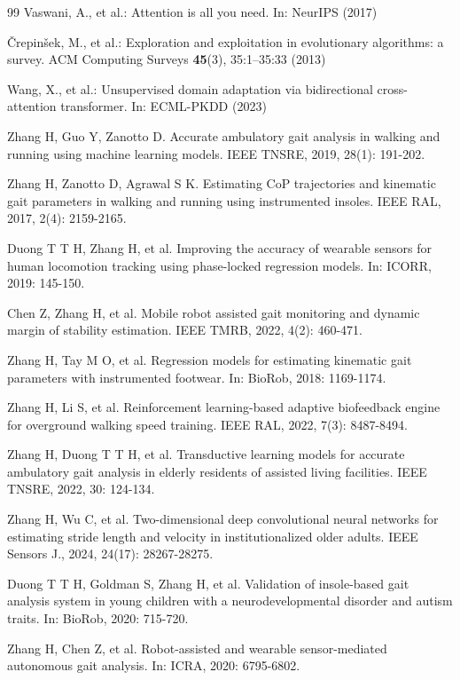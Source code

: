 \documentclass[conference]{IEEEtran}
\begin{document}
\begin{thebibliography}{99}
Vaswani, A., et al.: Attention is all you need. In: NeurIPS (2017)

Črepinšek, M., et al.: Exploration and exploitation in evolutionary algorithms: a survey. ACM Computing Surveys \textbf{45}(3), 35:1--35:33 (2013)

Wang, X., et al.: Unsupervised domain adaptation via bidirectional cross-attention transformer. In: ECML-PKDD (2023)

Zhang H, Guo Y, Zanotto D. Accurate ambulatory gait analysis in walking and running using machine learning models. IEEE TNSRE, 2019, 28(1): 191-202.

Zhang H, Zanotto D, Agrawal S K. Estimating CoP trajectories and kinematic gait parameters in walking and running using instrumented insoles. IEEE RAL, 2017, 2(4): 2159-2165.

Duong T T H, Zhang H, et al. Improving the accuracy of wearable sensors for human locomotion tracking using phase-locked regression models. In: ICORR, 2019: 145-150.

Chen Z, Zhang H, et al. Mobile robot assisted gait monitoring and dynamic margin of stability estimation. IEEE TMRB, 2022, 4(2): 460-471.

Zhang H, Tay M O, et al. Regression models for estimating kinematic gait parameters with instrumented footwear. In: BioRob, 2018: 1169-1174.

Zhang H, Li S, et al. Reinforcement learning-based adaptive biofeedback engine for overground walking speed training. IEEE RAL, 2022, 7(3): 8487-8494.

Zhang H, Duong T T H, et al. Transductive learning models for accurate ambulatory gait analysis in elderly residents of assisted living facilities. IEEE TNSRE, 2022, 30: 124-134.

Zhang H, Wu C, et al. Two-dimensional deep convolutional neural networks for estimating stride length and velocity in institutionalized older adults. IEEE Sensors J., 2024, 24(17): 28267-28275.

Duong T T H, Goldman S, Zhang H, et al. Validation of insole-based gait analysis system in young children with a neurodevelopmental disorder and autism traits. In: BioRob, 2020: 715-720.

Zhang H, Chen Z, et al. Robot-assisted and wearable sensor-mediated autonomous gait analysis. In: ICRA, 2020: 6795-6802.

\end{thebibliography}
\end{document}
